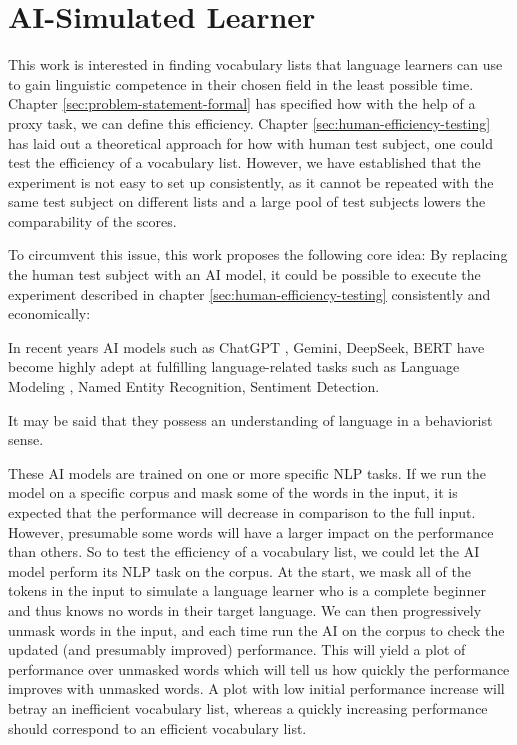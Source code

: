 \section{AI-Simulated Learner} \label{sec:ai-simulated-learner}

This work is interested in finding vocabulary lists that language learners can use to gain linguistic competence in their chosen field in the least possible time.
Chapter \ref{sec:problem-statement-formal} has specified how with the help of a proxy task, we can define this efficiency.
Chapter \ref{sec:human-efficiency-testing} has laid out a theoretical approach for how with human test subject, one could test the efficiency of a vocabulary list.
However, we have established that the experiment is not easy to set up consistently, as it cannot be repeated with the same test subject on different lists and a large pool of test subjects lowers the comparability of the scores.

To circumvent this issue, this work proposes the following core idea:
By replacing the human test subject with an AI model, it could be possible to execute the experiment described in chapter \ref{sec:human-efficiency-testing} consistently and economically:

In recent years AI models such as ChatGPT , Gemini, DeepSeek, BERT have become highly adept at fulfilling language-related tasks such as Language Modeling , Named Entity Recognition, Sentiment Detection.

It may be said that they possess an understanding of language in a behaviorist sense.

These AI models are trained on one or more specific NLP tasks.
If we run the model on a specific corpus and mask some of the words in the input, it is expected that the performance will decrease in comparison to the full input.
However, presumable some words will have a larger impact on the performance than others.
So to test the efficiency of a vocabulary list, we could let the AI model perform its NLP task on the corpus.
At the start, we mask all of the tokens in the input to simulate a language learner who is a complete beginner and thus knows no words in their target language.
We can then progressively unmask words in the input, and each time run the AI on the corpus to check the updated (and presumably improved) performance.
This will yield a plot of performance over unmasked words which will tell us how quickly the performance improves with unmasked words.
A plot with low initial performance increase will betray an inefficient vocabulary list, whereas a quickly increasing performance should correspond to an efficient vocabulary list.

